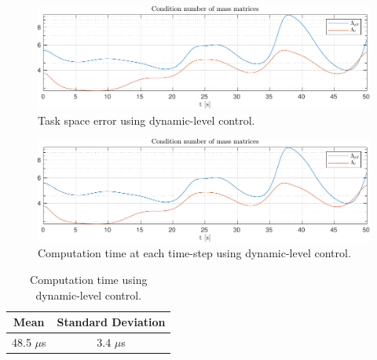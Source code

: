 \begin{figure}[h!]
    \centering
    \includegraphics[page=2,width=\linewidth]{assets/results/dynamic/h5data.pdf}
    \caption{Task space error using dynamic-level control.}
    \label{}
\end{figure}
\begin{figure}[h!]
    \centering
    \includegraphics[page=3,width=\linewidth]{assets/results/dynamic/h5data.pdf}
    \caption{Computation time at each time-step using dynamic-level control.}
    \label{}
\end{figure}

\begin{table}[h!]
    \centering
    \begin{tabular}{|c|c|}
        \hline
        Mean & Standard Deviation \\ \hline
        48.5 $\mu$s & 3.4 $\mu$s \\ \hline
    \end{tabular}
    \caption{Computation time using dynamic-level control.}
\end{table}

